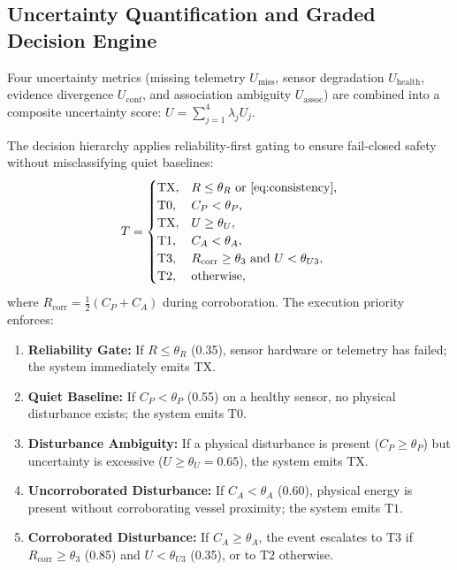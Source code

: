 \documentclass[conference]{IEEEtran}
\newcommand{\dstate}[1]{\ensuremath{\mathrm{#1}}}
\begin{document}
\subsection{Uncertainty Quantification and Graded Decision Engine}
\label{sec:decision-engine}

Four uncertainty metrics (missing telemetry $U_{\mathrm{miss}}$, sensor degradation $U_{\mathrm{health}}$, evidence divergence $U_{\mathrm{conf}}$, and association ambiguity $U_{\mathrm{assoc}}$) are combined into a composite uncertainty score: $U = \sum_{j=1}^4 \lambda_j U_j$.

The decision hierarchy applies reliability-first gating to ensure fail-closed safety without misclassifying quiet baselines:
\begin{equation}
T =
\begin{cases}
\dstate{TX}, & R \leq \theta_R \ \text{or}\ \text{\eqref{eq:consistency}}, \\
\dstate{T0}, & C_P < \theta_P, \\
\dstate{TX}, & U \geq \theta_U, \\
\dstate{T1}, & C_A < \theta_A, \\
\dstate{T3}, & R_{\mathrm{corr}} \geq \theta_3 \ \text{and}\ U < \theta_{U3}, \\
\dstate{T2}, & \text{otherwise},
\end{cases}
\label{eq:decision}
\end{equation}
where $R_{\mathrm{corr}} = \frac{1}{2}(C_P + C_A)$ during corroboration.
The execution priority enforces:
\begin{enumerate}
\item \textbf{Reliability Gate:} If $R \leq \theta_R$ (0.35), sensor hardware or telemetry has failed; the system immediately emits \dstate{TX}.
\item \textbf{Quiet Baseline:} If $C_P < \theta_P$ (0.55) on a healthy sensor, no physical disturbance exists; the system emits \dstate{T0}.
\item \textbf{Disturbance Ambiguity:} If a physical disturbance is present ($C_P \geq \theta_P$) but uncertainty is excessive ($U \geq \theta_U = 0.65$), the system emits \dstate{TX}.
\item \textbf{Uncorroborated Disturbance:} If $C_A < \theta_A$ (0.60), physical energy is present without corroborating vessel proximity; the system emits \dstate{T1}.
\item \textbf{Corroborated Disturbance:} If $C_A \geq \theta_A$, the event escalates to \dstate{T3} if $R_{\mathrm{corr}} \geq \theta_3$ (0.85) and $U < \theta_{U3}$ (0.35), or to \dstate{T2} otherwise.
\end{enumerate}
\end{document}
